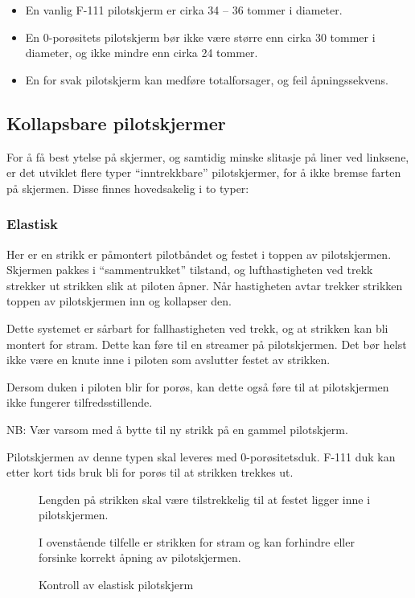\begin{itemize}
\item En vanlig F-111 pilotskjerm er cirka 34 – 36 tommer i diameter.
\item En 0-porøsitets pilotskjerm bør ikke være større enn cirka 30 tommer i diameter, og ikke mindre enn cirka 24 tommer.
\item En for svak pilotskjerm kan medføre totalforsager, og feil åpningssekvens.
\end{itemize}

\subsection{Kollapsbare pilotskjermer}
For å få best ytelse på skjermer, og samtidig minske slitasje på liner ved linksene, er det utviklet flere typer ``inntrekkbare'' pilotskjermer, for å ikke bremse farten på skjermen. Disse finnes hovedsakelig i to typer:

\subsubsection{Elastisk}
Her er en strikk er påmontert pilotbåndet og festet i toppen av pilotskjermen. Skjermen pakkes i ``sammentrukket'' tilstand, og lufthastigheten ved trekk strekker ut strikken slik at piloten åpner. Når hastigheten avtar trekker strikken toppen av pilotskjermen inn og kollapser den.

Dette systemet er sårbart for fallhastigheten ved trekk, og at strikken kan bli montert for stram. Dette kan føre til en streamer på pilotskjermen. Det bør helst ikke være en knute inne i piloten som avslutter festet av strikken.

Dersom duken i piloten blir for porøs, kan dette også føre til at pilotskjermen ikke fungerer tilfredsstillende.

NB: Vær varsom med å bytte til ny strikk på en gammel pilotskjerm.

Pilotskjermen av denne typen skal leveres med 0-porøsitetsduk. F-111 duk kan etter kort tids bruk bli for porøs til at strikken trekkes ut.

\begin{figure}
	Lengden på strikken skal være tilstrekkelig til at festet ligger inne i pilotskjermen.

	I ovenstående tilfelle er strikken for stram og kan forhindre eller forsinke korrekt åpning av pilotskjermen.	
	\caption{Kontroll av elastisk pilotskjerm}
\end{figure}

